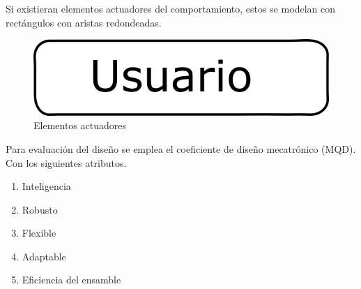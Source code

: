Si existieran elementos actuadores del comportamiento, estos se modelan con rectángulos con aristas redondeadas.

\begin{figure}[h!]
    \centering
        \includegraphics[scale=0.20]{Proyecto Integrador Figuras/21 Elementos Actuadores.png}
        \caption{Elementos actuadores}
\end{figure}

Para evaluación del diseño se emplea el coeficiente de diseño mecatrónico (MQD). Con los siguientes atributos.
\begin{enumerate}
    \item Inteligencia
    \item Robusto
    \item Flexible
    \item Adaptable
    \item Eficiencia del ensamble
\end{enumerate}